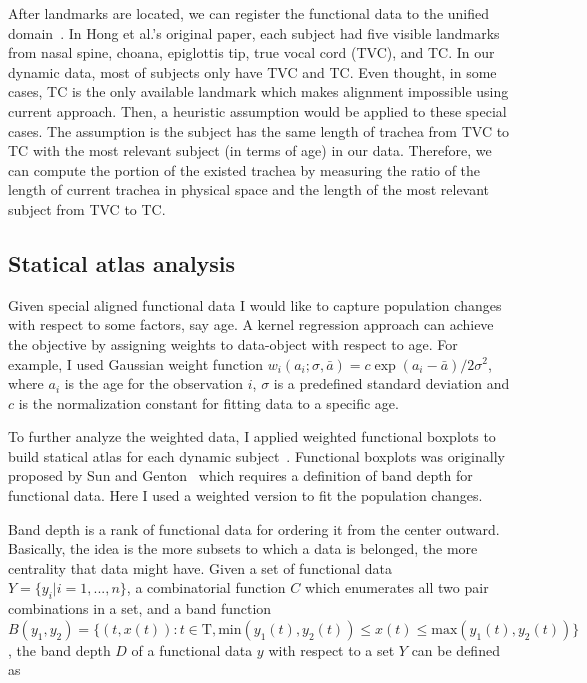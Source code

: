 After landmarks are located, we can register the functional data to the unified domain~\cite{ramsay2006functional}.
In Hong et al.'s original paper, each subject had five visible landmarks from nasal spine, choana, epiglottis tip, true vocal cord (TVC), and TC.
In our dynamic data, most of subjects only have TVC and TC.
Even thought, in some cases, TC is the only available landmark which makes alignment impossible using current approach.
Then, a heuristic assumption would be applied to these special cases.
The assumption is the subject has the same length of trachea from TVC to TC with the most relevant subject (in terms of age) in our data.
Therefore, we can compute the portion of the existed trachea by measuring the ratio of the length of current trachea in physical space and the length of the most relevant subject from TVC to TC.

\subsection{Statical atlas analysis}
\label{sec:statical_atlas_analysis}
Given special aligned functional data I would like to capture population changes with respect to some factors, say age.
A kernel regression approach can achieve the objective by assigning weights to data-object with respect to age.
For example, I used Gaussian weight function $w_i(a_i; \sigma, \bar{a}) = c\exp{(a_i-\bar{a})/2\sigma^2}$, where $a_i$ is the age for the observation $i$, $\sigma$ is a predefined standard deviation and $c$ is the normalization constant for fitting data to a specific age.

To further analyze the weighted data, I applied weighted functional boxplots to build statical atlas for each dynamic subject~\cite{hong2013weighted}.
Functional boxplots was originally proposed by Sun and Genton~\cite{sun2011functional} which requires a definition of band depth for functional data.
Here I used a weighted version to fit the population changes.

Band depth is a rank of functional data for ordering it from the center outward. 
Basically, the idea is the more subsets to which a data is belonged, the more centrality that data might have.
Given a set of functional data $Y=\{y_i | i=1,...,n\}$, a combinatorial function $C$ which enumerates all two pair combinations in a set, and a band function $B(y_1, y_2) = \{(t,x(t)): t\in \mathrm{T}, \mathrm{min}(y_1(t),y_2(t)) \leq x(t) \leq \mathrm{max}(y_1(t),y_2(t))\}$,
the band depth $D$ of a functional data $y$ with respect to a set $Y$ can be defined as

